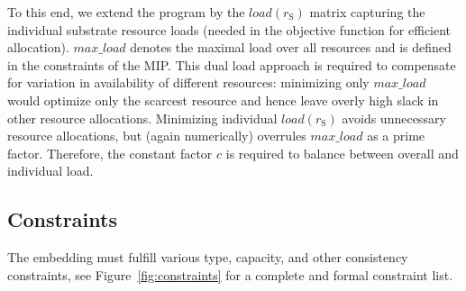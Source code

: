 \documentclass[conference,10pt]{IEEEtran}
\newcommand{\mrm}{\mathrm}
\begin{document}
To this end, we extend the program by the
$load(r_\mrm{S})$ matrix capturing the individual substrate resource loads
(needed in the objective function for efficient allocation).
$max\_load$
denotes the maximal load over all resources and is defined in the
constraints of the MIP.
This dual load approach is required to compensate for variation in availability of different resources:
minimizing only $max\_load$ would optimize only the  scarcest resource and hence leave overly high slack in other resource allocations.
Minimizing individual $load(r_\mrm{S})$ avoids unnecessary resource allocations, but (again numerically) overrules $max\_load$ as a prime factor.
Therefore, the constant factor $c$ is required to balance between overall and individual load.


\subsection{Constraints}\label{ssec:mip:prog:constraints}

The embedding must fulfill various type, capacity, and other
consistency constraints, see Figure~\ref{fig:constraints} for a
complete and formal constraint list.
\end{document}
